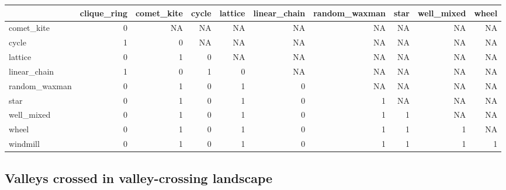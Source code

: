 \documentclass[
]{book}
\begin{document}
\begin{table}
\centering
\begin{tabular}[t]{l|r|r|r|r|r|r|r|r|r}
\hline
  & clique\_ring & comet\_kite & cycle & lattice & linear\_chain & random\_waxman & star & well\_mixed & wheel\\
\hline
comet\_kite & 0 & NA & NA & NA & NA & NA & NA & NA & NA\\
\hline
cycle & 1 & 0 & NA & NA & NA & NA & NA & NA & NA\\
\hline
lattice & 0 & 1 & 0 & NA & NA & NA & NA & NA & NA\\
\hline
linear\_chain & 1 & 0 & 1 & 0 & NA & NA & NA & NA & NA\\
\hline
random\_waxman & 0 & 1 & 0 & 1 & 0 & NA & NA & NA & NA\\
\hline
star & 0 & 1 & 0 & 1 & 0 & 1 & NA & NA & NA\\
\hline
well\_mixed & 0 & 1 & 0 & 1 & 0 & 1 & 1 & NA & NA\\
\hline
wheel & 0 & 1 & 0 & 1 & 0 & 1 & 1 & 1 & NA\\
\hline
windmill & 0 & 1 & 0 & 1 & 0 & 1 & 1 & 1 & 1\\
\hline
\end{tabular}
\end{table}

\hypertarget{valleys-crossed-in-valley-crossing-landscape}{%
\subsection{Valleys crossed in valley-crossing landscape}\label{valleys-crossed-in-valley-crossing-landscape}}
\end{document}
